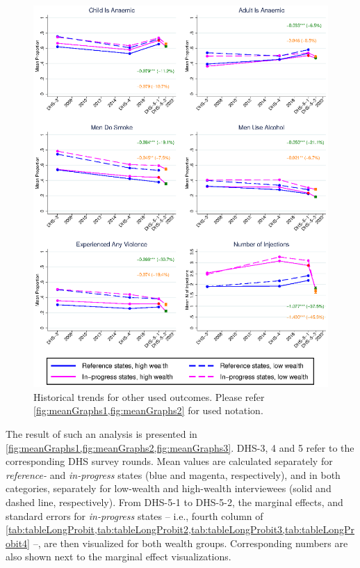 \documentclass[12pt,a4paper,notitlepage]{article}
\begin{document}
\begin{figure}
\includegraphics[width=1\linewidth]{images/meanGraphs3.eps}
\caption{\label{fig:meanGraphs3} Historical trends for other used outcomes. Please refer \cref{fig:meanGraphs1,fig:meanGraphs2} for used notation.}
\end{figure}

The result of such an analysis is presented in \cref{fig:meanGraphs1,fig:meanGraphs2,fig:meanGraphs3}. DHS-3, 4 and 5 refer to the corresponding DHS survey rounds. Mean values are calculated separately for \textit{reference-} and \textit{in-progress} states (blue and magenta, respectively), and in both categories, separately for low-wealth and high-wealth interviewees (solid and dashed line, respectively). From DHS-5-1 to DHS-5-2, the marginal effects, and standard errors for \textit{in-progress} states -- i.e., fourth column of \cref{tab:tableLongProbit,tab:tableLongProbit2,tab:tableLongProbit3,tab:tableLongProbit4} --,  are then visualized for both wealth groups. Corresponding numbers are also shown next to the marginal effect visualizations.
\end{document}

